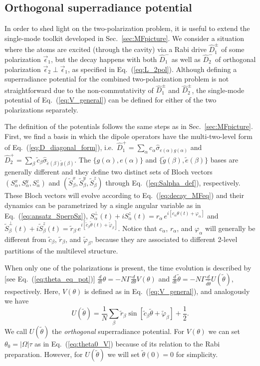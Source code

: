 \documentclass[aps,prx,superscriptaddress,twocolumn,notitlepage,nofootinbib,longbibliography]{revtex4-2}
\begin{document}
\subsection{Orthogonal superradiance potential}

In order to shed light on the two-polarization problem, it is useful to extend the single-mode toolkit developed in Sec.~\ref{sec:MFpicture}. We consider a situation where the atoms are excited (through the cavity) via a Rabi drive $\hat{D}_1^\pm$ of some polarization $\vec{\epsilon}_1$, but the decay happens with both $\hat{D}_1^-$ as well as $\hat{D}_2^-$ of orthogonal polarization $\vec{\epsilon}_2\perp\vec{\epsilon}_1$, as specified in Eq.~(\ref{eq:L_2pol}). Although defining a superradiance potential for the combined two-polarization problem is not straightforward due to the non-commutativity of $\hat{D}^\pm_1$ and $\hat{D}^\pm_2$, the single-mode potential of Eq.~(\ref{eq:V_general}) can be defined for either of the two polarizations separately.

The definition of the potentials follows the same steps as in Sec.~\ref{sec:MFpicture}. First, we find a basis in which the dipole operators have the multi-two-level form of Eq.~(\ref{eq:D_diagonal_form}), i.e.~$\hat{D}_1^+ = \sum_\alpha c_\alpha \hat{\sigma}_{e(\alpha)g(\alpha)}$ and $\hat{D}_2^+ = \sum_\beta \tilde{c}_\beta \hat{\sigma}_{\tilde{e}(\beta)\tilde{g}(\beta)}$.
The $\{g(\alpha),e(\alpha)\}$ and $\{\tilde{g}(\beta),\tilde{e}(\beta)\}$ bases are generally different and they define two distinct sets of Bloch vectors $(S^x_\alpha,S^y_\alpha,S^z_\alpha)$ and $(\tilde{S}^x_\beta,\tilde{S}^y_\beta,\tilde{S}^z_\beta)$ through Eq.~(\ref{eq:Salpha_def}), respectively.
These Bloch vectors will evolve according to Eq.~(\ref{eq:decay_MFeq}) and their dynamics can be parametrized by a single angular variable as in Eq.~(\ref{eq:ansatz_SperpSz}), $S^\perp_\alpha(t) + i S^z_\alpha(t) = r_\alpha\, e^{i[ c_\alpha \theta(t) + \varphi_\alpha ]}$ and $\tilde{S}^\perp_\beta(t) + i \tilde{S}^z_\beta(t) = \tilde{r}_\beta\, e^{i[ \tilde{c}_\beta \tilde\theta(t) + \tilde{\varphi}_\beta ]}$.
Notice that $c_\alpha$, $r_\alpha$, and $\varphi_\alpha$ will generally be different from $\tilde{c}_\beta$, $\tilde{r}_\beta$, and $\tilde{\varphi}_\beta$, because they are associated to different 2-level partitions of the multilevel structure.

When only one of the polarizations is present, the time evolution is described by [see Eq.~(\ref{eq:theta_eq_pot})] $\frac{d}{dt} \theta=-N\Gamma\frac{d}{d\theta}V(\theta)$ and $\frac{d}{dt} \tilde\theta=-N\Gamma\frac{d}{d\tilde\theta}U(\tilde\theta)$, respectively. Here, $V(\theta)$ is defined as in Eq.~(\ref{eq:V_general}), and analogously we have
\begin{equation}
	U(\tilde\theta) = \frac{1}{N} \sum_\beta \tilde{r}_\beta \sin\left[ \tilde{c}_\beta \tilde{\theta} + \tilde{\varphi}_\beta \right] + \frac{1}{2}.
\label{eq:U_general}
\end{equation}
We call $U(\tilde\theta)$ the \emph{orthogonal} superradiance potential.
For $V(\theta)$ we can set $\theta_0=|\Omega|\tau$ as in Eq.~(\ref{eq:theta0_V}) because of its relation to the Rabi preparation. However, for $U(\tilde\theta)$ we will set $\tilde{\theta}(0)=0$ for simplicity.
\end{document}
